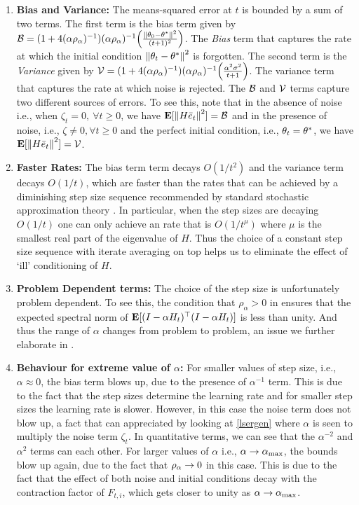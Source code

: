 \begin{enumerate}[leftmargin=*]
\item \textbf{Bias and Variance:} The means-squared error at $t$ is bounded by a sum of two terms. The first term is the bias term given by $\mathcal{B}=(1+4(\alpha\rho_{\alpha})^{-1}) (\alpha\rho_{\alpha})^{-1} \Big(\frac{\left\| \theta_0-\theta^*\right\|^2}{(t+1)^2}\Big)$.  The \emph{Bias} term that captures the rate at which the initial condition $\left\| \theta_t-\theta^*\right\|^2$ is forgotten. The second term is the \emph{Variance} given by $\mathcal{V}=(1+4(\alpha\rho_{\alpha})^{-1}) (\alpha\rho_{\alpha})^{-1} \Big(\frac{\alpha^2\sigma^2}{t+1} \Big)$. The variance term that captures the rate at which noise is rejected. The $\mathcal{B}$ and $\mathcal{V}$ terms capture two different sources of errors. To see this, note that in the absence of noise i.e., when $\zeta_t=0,~\forall t\geq 0$, we have $\mathbf{E}[\left\| H\bar{e}_t\right\|^2]=\mathcal{B}$ and in the presence of noise, i.e., $\zeta\neq 0,\forall t\geq 0$ and the perfect initial condition, i.e., $\theta_t=\theta^*$, we have $\mathbf{E}[\left\| H\bar{e}_t\right\|^2]=\mathcal{V}$.
\item \textbf{Faster Rates:} The bias term term decays $O(1/t^2)$ and the variance term decays $O(1/t)$, which are faster than the rates that can be achieved by a diminishing step size sequence recommended by standard stochastic approximation theory \cite{SA}. In particular, when the step sizes are decaying $O(1/t)$ one can only achieve an rate that is $O(1/t^\mu)$ where $\mu$ is the smallest real part of the eigenvalue of $H$. Thus the choice of a constant step size sequence with iterate averaging on top helps us to eliminate the effect of `ill' conditioning of $H$.
\item \textbf{Problem Dependent terms:} The choice of the step size is unfortunately problem dependent. To see this, the condition that $\rho_{\alpha}>0$ in  ensures that the expected spectral norm of $\mathbf{E}[(I-\alpha H_t)^\top(I-\alpha H_t)]$ is less than unity. And thus the range of $\alpha$ changes from problem to problem, an issue we further elaborate in .
\item \textbf{Behaviour for extreme value of $\alpha$:} For smaller values of step size, i.e., $\alpha\approx 0$, the bias term blows up, due to the presence of $\alpha^{-1}$ term. This is due to the fact that the step sizes determine the learning rate and for smaller step sizes the learning rate is slower. However, in this case the noise term does not blow up, a fact that can appreciated by looking at \eqref{lsergen} where $\alpha$ is seen to multiply the noise term $\zeta_t$. In quantitative terms, we can see that the $\alpha^{-2}$ and $\alpha^2$ terms can each other. For larger values of $\alpha$ i.e., $\alpha\rightarrow \alpha_{\max}$, the bounds blow up again, due to the fact that $\rho_{\alpha}\rightarrow 0$ in this case. This is due to the fact that the effect of both noise and initial conditions decay with the contraction factor of $F_{t,i}$, which gets closer to unity as $\alpha\rightarrow\alpha_{\max}$.
\end{enumerate}
